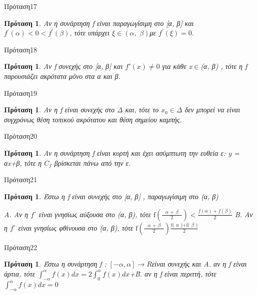 \documentclass[greek]{beamer}
\newtheorem{proposition}[theorem]{Πρόταση}
\begin{document}
\begin{frame}{Πρόταση17}
 \begin{proposition}
  \normalfont Αν η συνάρτηση f είναι παραγωγίσιμη στο [α, β] και ${{f}^{'}}(\alpha )<0<{{f}^{'}}(\beta )$, τότε υπάρχει $\xi \in (\alpha ,\,\,\beta )$με ${{f}^{'}}(\xi )=0$.
 \end{proposition}
\end{frame}

\begin{frame}{Πρόταση18}
 \begin{proposition}
  \normalfont Αν f συνεχής στο [α, β] και ${f}'(x)\ne 0$ για κάθε x$\in $(α, β) , τότε η f
  παρουσιάζει ακρότατα μόνο στα α και β.
 \end{proposition}
\end{frame}

\begin{frame}{Πρόταση19}
 \begin{proposition}
  \normalfont Αν η f είναι συνεχής στο Δ και, τότε το ${{x}_{0}}\in \Delta $ δεν μπορεί να είναι συγχρόνως θέση τοπικού ακρότατου και θέση σημείου καμπής.
 \end{proposition}
\end{frame}

\begin{frame}{Πρόταση20}
 \begin{proposition}
  \normalfont Αν η συνάρτηση f είναι κυρτή και έχει ασύμπτωτη την ευθεία ε: y = αx+β, τότε η ${{C}_{f}}$ βρίσκεται πάνω από την ε.
 \end{proposition}
\end{frame}

\begin{frame}{Πρόταση21}
 \begin{proposition}
  \normalfont Έστω η f είναι συνεχής στο [α, β] , παραγωγίσιμη στο (α, β)

  Α. Αν η $f΄$ είναι γνησίως αύξουσα στο (α, β), τότε $\text{f}\left( \frac{\text{ }\!\!\alpha\!\!\text{ + }\!\!\beta\!\!\text{ }}{\text{2}} \right)<\frac{f(\alpha )+f(\beta )}{2}$
  Β. Αν η $f΄$ είναι γνησίως φθίνουσα στο (α, β), τότε $\text{f}\left( \frac{\text{ }\!\!\alpha\!\!\text{ + }\!\!\beta\!\!\text{ }}{\text{2}} \right)\text{}\frac{\text{f( }\!\!\alpha\!\!\text{ )+f( }\!\!\beta\!\!\text{ )}}{\text{2}}$

 \end{proposition}
\end{frame}

\begin{frame}{Πρόταση22}
 \begin{proposition}
  \normalfont Έστω η συνάρτηση f : $[-\alpha ,\alpha ]\to R$είναι συνεχής και
  Α. αν η f είναι άρτια, τότε $\int_{-\alpha }^{\alpha }{f(x)dx}=2\int_{0}^{\alpha }{f(x)dx}$+\=
  Β. αν η f είναι περιττή, τότε $\int_{-\alpha }^{\alpha }{f(x)dx}=0$
 \end{proposition}
\end{frame}
\end{document}
